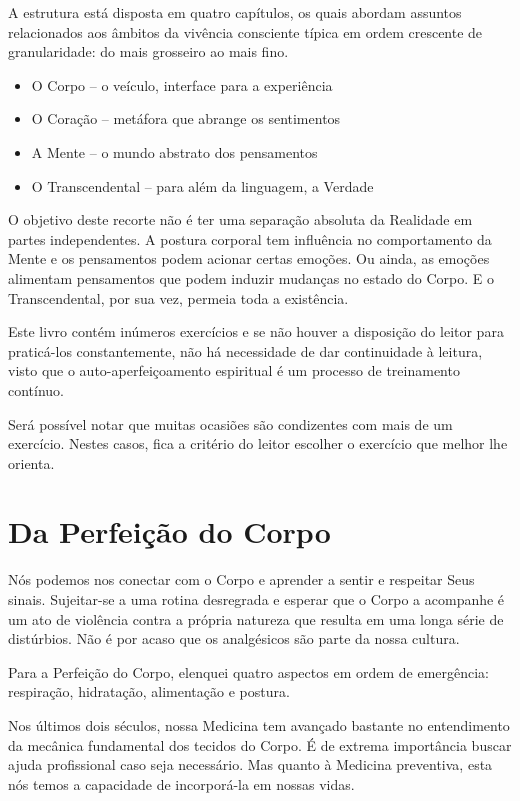 \documentclass[oneside, 12pt]{book}
\begin{document}
A estrutura está disposta em quatro capítulos, os quais abordam assuntos relacionados aos âmbitos da vivência consciente típica em ordem crescente de granularidade: do mais grosseiro ao mais fino.

\begin{itemize}
\item O Corpo -- o veículo, interface para a experiência
\item O Coração -- metáfora que abrange os sentimentos
\item A Mente -- o mundo abstrato dos pensamentos
\item O Transcendental -- para além da linguagem, a Verdade
\end{itemize}

O objetivo deste recorte não é ter uma separação absoluta da Realidade em partes independentes. A postura corporal tem influência no comportamento da Mente e os pensamentos podem acionar certas emoções. Ou ainda, as emoções alimentam pensamentos que podem induzir mudanças no estado do Corpo. E o Transcendental, por sua vez, permeia toda a existência.

Este livro contém inúmeros exercícios e se não houver a disposição do leitor para praticá-los constantemente, não há necessidade de dar continuidade à leitura, visto que o auto-aperfeiçoamento espiritual é um processo de treinamento contínuo.

Será possível notar que muitas ocasiões são condizentes com mais de um exercício. Nestes casos, fica a critério do leitor escolher o exercício que melhor lhe orienta.

\chapter*{Da Perfeição do Corpo}

Nós podemos nos conectar com o Corpo e aprender a sentir e respeitar Seus sinais. Sujeitar-se a uma rotina desregrada e esperar que o Corpo a acompanhe é um ato de violência contra a própria natureza que resulta em uma longa série de distúrbios. Não é por acaso que os analgésicos são parte da nossa cultura.

Para a Perfeição do Corpo, elenquei quatro aspectos em ordem de e\-mer\-gên\-cia: respiração, hidratação, alimentação e postura.

Nos últimos dois séculos, nossa Medicina tem avançado bastante no entendimento da mecânica fundamental dos tecidos do Corpo. É de extrema importância buscar ajuda profissional caso seja necessário. Mas quanto à Medicina preventiva, esta nós temos a capacidade de incorporá-la em nossas vidas.
\end{document}
